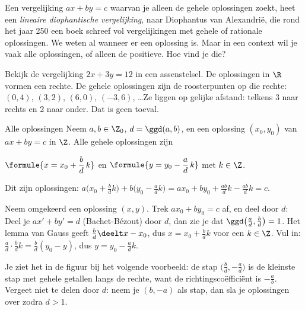 Een vergelijking $ax + by = c$ waarvan je alleen de gehele oplossingen zoekt, heet een \emph{lineaire diophantische vergelijking}, naar Diophantus van Alexandrië, die rond het jaar 250 een boek schreef vol vergelijkingen met gehele of rationale oplossingen. We weten al wanneer er een oplossing is. Maar in een context wil je vaak alle oplossingen, of alleen de positieve. Hoe vind je die?

Bekijk de vergelijking $2x + 3y = 12$ in een assenstelsel. De oplossingen in $\R$ vormen een rechte. De gehele oplossingen zijn de roosterpunten op die rechte: $(0, 4)$, $(3, 2)$, $(6, 0)$, $(-3, 6)$, \ldots Ze liggen op gelijke afstand: telkens 3 naar rechts en 2 naar onder. Dat is geen toeval.

\begin{theorie}
\begin{stelling}{Alle oplossingen}
Neem $a, b \in \Z_0$, $d = \ggd(a, b)$, en een oplossing $(x_0, y_0)$ van $ax + by = c$ in $\Z$. Alle gehele oplossingen zijn

\vspace{1mm}
\qquad $\formule{x = x_0 + \dfrac{b}{d}\,k}$ \qquad en \qquad $\formule{y = y_0 - \dfrac{a}{d}\,k}$ \qquad met $k \in \Z$.
\end{stelling}

\begin{bewijs}
Dit zijn oplossingen: $a\bigl(x_0 + \tfrac bd k\bigr) + b\bigl(y_0 - \tfrac ad k\bigr) = ax_0 + by_0 + \tfrac{ab}{d}k - \tfrac{ab}{d}k = c$.

Neem omgekeerd een oplossing $(x, y)$. Trek $ax_0 + by_0 = c$ af, en deel door $d$:
Deel je $ax' + by' = d$ (Bachet-Bézout) door $d$, dan zie je dat $\ggd\bigl(\tfrac ad, \tfrac bd\bigr) = 1$. Het lemma van Gauss geeft $\tfrac bd \deelt x - x_0$, dus $x = x_0 + \tfrac bd k$ voor een $k \in \Z$. Vul in: $\tfrac ad \cdot \tfrac bd k = \tfrac bd (y_0 - y)$, dus $y = y_0 - \tfrac ad k$.
\end{bewijs}
\end{theorie}

Je ziet het in de figuur bij het volgende voorbeeld: de stap $\bigl(\tfrac bd, -\tfrac ad\bigr)$ is de kleinste stap met gehele getallen langs de rechte, want de richtingscoëfficiënt is $-\tfrac ab$. Vergeet niet te delen door $d$: neem je $(b, -a)$ als stap, dan sla je oplossingen over zodra $d > 1$.

